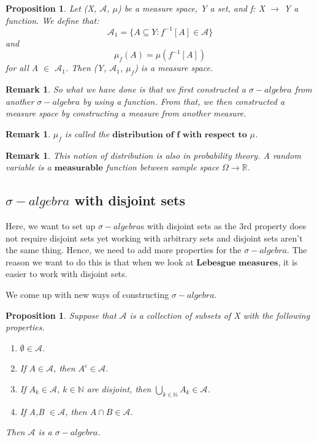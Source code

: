 \documentclass[twoside]{article}
\newtheorem{proposition}[theorem]{Proposition}
\newtheorem{remark}[theorem]{Remark}
\newcommand{\sa}{\sigma-algebra}
\begin{document}
\begin{proposition}
Let (X, $\mathcal{A}$, $\mu$) be a measure space, Y a set, and f: X $\rightarrow$ Y a function. We define that:
$$
\mathcal{A}_1 = \{A \subseteq Y: f^{-1}[A] \in \mathcal{A}\}
$$
and
$$
\mu_f(A) = \mu(f^{-1}[A])
$$
for all A $\in$ $\mathcal{A}_1$. Then (Y, $\mathcal{A}_1$, $\mu_f$) is a measure space.
\end{proposition}

\begin{remark}
So what we have done is that we first constructed a $\sa$ from another $\sa$ by using a function. From that, we then constructed a measure space by constructing a measure from another measure.
\end{remark}

\begin{remark}
$\mu_f$ is called the $\textbf{distribution of f with respect to $\mu$}$.
\end{remark}

\begin{remark}
This notion of distribution is also in probability theory. A random variable is a $\textbf{measurable}$ function between sample space $\Omega \rightarrow \mathbb{R}$.
\end{remark}



\subsection{$\sa$ with disjoint sets}
Here, we want to set up $\sa$s with disjoint sets as the 3rd property does not require disjoint sets yet working with arbitrary sets and disjoint sets aren't the same thing. Hence, we need to add more properties for the $\sa$. The reason we want to do this is that when we look at $\textbf{Lebesgue measures}$, it is easier to work with disjoint sets. 

We come up with new ways of constructing $\sa$.

\begin{proposition}
Suppose that $\mathcal{A}$ is a collection of subsets of X with the following properties.
\begin{enumerate}
    \item $\emptyset \in \mathcal{A}$.
    \item If $A \in \mathcal{A}$, then $A^c \in \mathcal{A}$.
    \item If $A_k \in \mathcal{A}$, $k \in \mathbb{N}$ are disjoint, then $\bigcup_{k \in \mathbb{N}}A_k \in \mathcal{A}$.
    \item If A,B $\in \mathcal{A}$, then $A \cap B \in \mathcal{A}$.
\end{enumerate}
Then $\mathcal{A}$ is a $\sa$.
\end{proposition}
\end{document}
